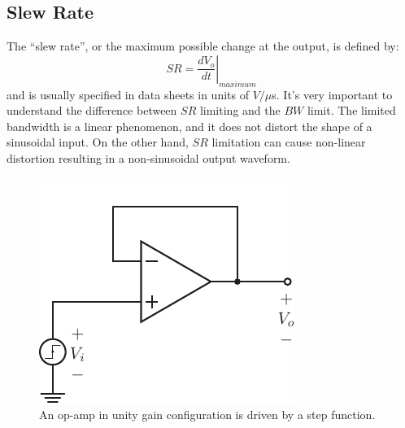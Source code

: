 \subsection{Slew Rate}
The ``slew rate'', or the maximum possible change at the output, is defined by:
\begin{equation}
  SR = \left. \frac{dV_o}{dt} \right|_{maximum}
\end{equation}
and is usually specified in data sheets in units of $V/\mu$s.  It's very important to understand the difference between $SR$ limiting and the $BW$ limit.  The limited bandwidth is a linear phenomenon, and it does not distort the shape of a sinusoidal input.  On the other hand, $SR$ limitation can cause non-linear distortion resulting in a non-sinusoidal output waveform.
\begin{figure}[tb]
\begin{center}
\includegraphics[scale=1]{opamp_unitygain_step}
\end{center}
\caption{An op-amp in unity gain configuration is driven by a step function.} \label{fig:opamp_unitygain}
\end{figure}

